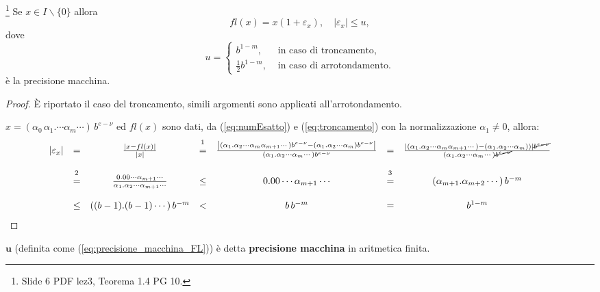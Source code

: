\begin{theorem} \footnote{Slide 6 PDF lez3, Teorema 1.4 PG 10.}\label{th:precisione_macchina_FL}
	Se $x\in I\backslash\{ 0\}$ allora
	\begin{equation*}
		fl(x)=x(1+\varepsilon_x), \quad |\varepsilon_x|\leq u,
	\end{equation*}
	dove
	\begin{equation}\label{eq:precisione_macchina_FL}
		u=
		\begin{cases}
			b^{1-m}, &\text{ in caso di troncamento},\\
			\frac{1}{2}b^{1-m}, &\text{ in caso di arrotondamento}.
		\end{cases}
	\end{equation}
	è la precisione macchina.
\end{theorem}
\begin{proof}
	È riportato il caso del troncamento, simili argomenti sono applicati all'arrotondamento.
	
	$x=(\alpha_0\,\alpha_1.\cdots\alpha_m\cdots)\,b^{e-\nu}$ ed $fl(x)$ sono dati, da (\ref{eq:numEsatto}) e (\ref{eq:troncamento}) con la normalizzazione $\alpha_1\neq 0$, allora:
	\begin{equation*}
		\begin{matrix}
			|\varepsilon_x|&=&\frac{|x - fl(x)|}{|x|}&\overset{\footnotemark}{=}&\frac{\left|(\alpha_1.\alpha_2\cdots\alpha_m\alpha_{m+1}\cdots)b^{e-\nu} - (\alpha_1.\alpha_2\cdots\alpha_m)b^{e-\nu}\right|}{(\alpha_1.\alpha_2\cdots\alpha_m\cdots)b^{e-\nu}}
			&=&\frac{|(\alpha_1.\alpha_2\cdots\alpha_m\alpha_{m+1}\cdots) - (\alpha_1.\alpha_2\cdots\alpha_m))|\cancel{b^{e-\nu}}}{(\alpha_1.\alpha_2\cdots\alpha_m\cdots)\cancel{b^{e-\nu}}}\\\\
			&\overset{\footnotemark}{=}&\frac{0.00\cdots\alpha_{m+1}\cdots}{\alpha_1.\alpha_2\cdots\alpha_{m+1}\cdots}&\leq& 0.00\cdots\alpha_{m+1}\cdots &\overset{\footnotemark}{=}&(\alpha_{m+1}.\alpha_{m+2}\cdots)\, b^{-m}\\\\
			&\leq&((b-1).(b-1)\cdots)\, b^{-m}&<&b\, b^{-m}&=& b^{1-m}
		\end{matrix}
	\end{equation*}
\end{proof}
\begin{definition}
	$\boldsymbol u$ (definita come (\ref{eq:precisione_macchina_FL})) è detta \textbf{precisione macchina} in aritmetica finita.
\end{definition}

